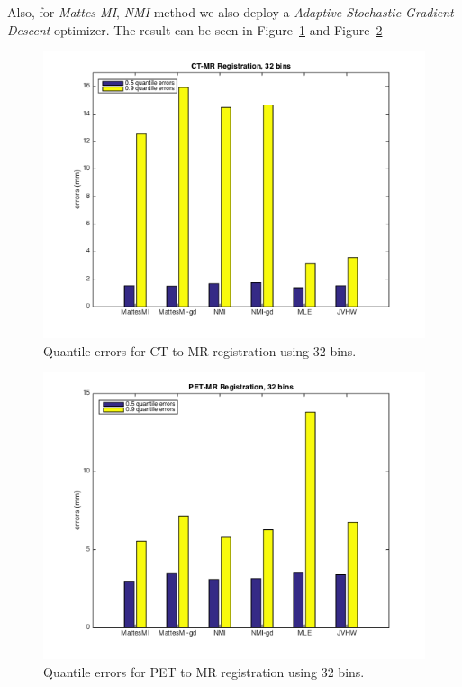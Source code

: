 \documentclass{IEEEtran}
\begin{document}
  Also, for \emph{Mattes MI}, \emph{NMI} method we also deploy a \emph{Adaptive Stochastic Gradient Descent} optimizer. The result can be seen in Figure~\ref{fig:CT_32bin} and Figure~\ref{fig:PET_32bin}

  \begin{figure}[htbp]
    \centering
    \includegraphics[width=\columnwidth]{CT_32bin.png}
    \caption{Quantile errors for CT to MR registration using 32 bins.}
    \label{fig:CT_32bin}
  \end{figure}

  \begin{figure}[htbp]
    \centering
    \includegraphics[width=\columnwidth]{PET_32bin.png}
    \caption{Quantile errors for PET to MR registration using 32 bins.}
    \label{fig:PET_32bin}
  \end{figure}
\end{document}
